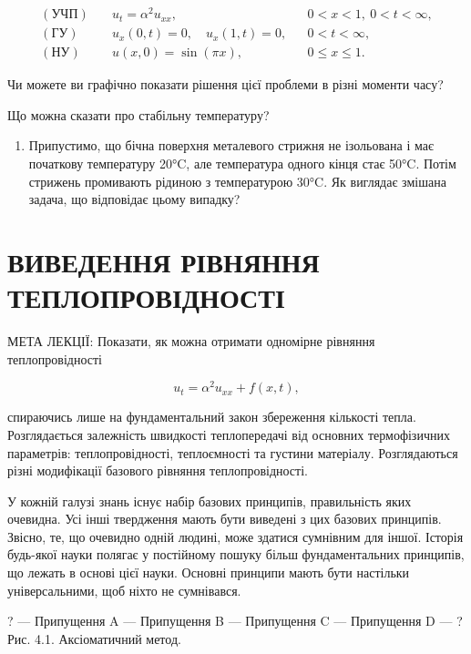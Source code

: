 \documentclass[
  ukrainian,
]{article}
\providecommand{\tightlist}{%
  \setlength{\itemsep}{0pt}\setlength{\parskip}{0pt}}
\begin{document}
\[
\begin{aligned}
(\text{УЧП})\quad & u_t = \alpha^2 u_{xx}, && 0 < x < 1,\ 0 < t < \infty, \\
(\text{ГУ})\quad & u_x(0,t) = 0,\quad u_x(1,t) = 0, && 0 < t < \infty, \\
(\text{НУ})\quad & u(x,0) = \sin(\pi x), && 0 \leqslant x \leqslant 1.
\end{aligned}
\]

Чи можете ви графічно показати рішення цієї проблеми в різні моменти
часу?

Що можна сказати про стабільну температуру?

\begin{enumerate}
\def\labelenumi{\arabic{enumi}.}
\setcounter{enumi}{3}
\tightlist
\item
  Припустимо, що бічна поверхня металевого стрижня не ізольована і має
  початкову температуру 20°C, але температура одного кінця стає 50°C.
  Потім стрижень промивають рідиною з температурою 30°C. Як виглядає
  змішана задача, що відповідає цьому випадку?
\end{enumerate}

\section{ВИВЕДЕННЯ РІВНЯННЯ
ТЕПЛОПРОВІДНОСТІ}\label{ux432ux438ux432ux435ux434ux435ux43dux43dux44f-ux440ux456ux432ux43dux44fux43dux43dux44f-ux442ux435ux43fux43bux43eux43fux440ux43eux432ux456ux434ux43dux43eux441ux442ux456}

МЕТА ЛЕКЦІЇ: Показати, як можна отримати одномірне рівняння
теплопровідності

\[u_t = \alpha^2 u_{xx} + f(x, t),\]

спираючись лише на фундаментальний закон збереження кількості тепла.
Розглядається залежність швидкості теплопередачі від основних
термофізичних параметрів: теплопровідності, теплоємності та густини
матеріалу. Розглядаються різні модифікації базового рівняння
теплопровідності.

У кожній галузі знань існує набір базових принципів, правильність яких
очевидна. Усі інші твердження мають бути виведені з цих базових
принципів. Звісно, те, що очевидно одній людині, може здатися сумнівним
для іншої. Історія будь-якої науки полягає у постійному пошуку більш
фундаментальних принципів, що лежать в основі цієї науки. Основні
принципи мають бути настільки універсальними, щоб ніхто не сумнівався.

? --- Припущення A --- Припущення B --- Припущення C --- Припущення D
--- ? Рис. 4.1. Аксіоматичний метод.
\end{document}

